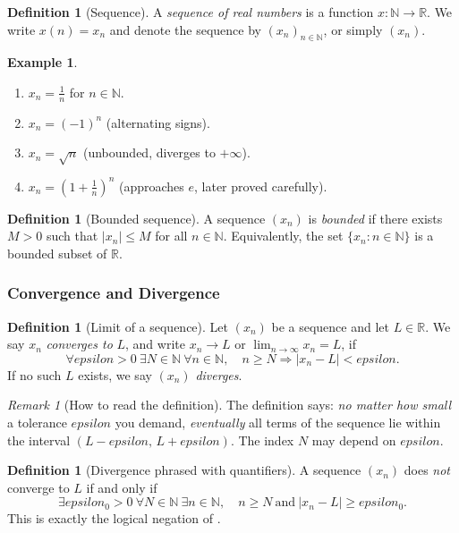 \documentclass[12pt]{article}
\numberwithin{equation}{section}
\def\abs#1{|#1|}
\def\eps{epsilon}
\newcommand{\RR}{\mathbb{R}}
\newcommand{\NN}{\mathbb{N}}
\DeclarePairedDelimiter{\abs}{\lvert}{\rvert}
\newcommand{\eps}{\varepsilon}               %
\theoremstyle{plain}
\theoremstyle{definition}
\newtheorem{definition}[theorem]{Definition}
\newtheorem{example}[theorem]{Example}
\theoremstyle{remark}
\newtheorem{remark}[theorem]{Remark}
\begin{document}
\begin{definition}[Sequence]
A \emph{sequence of real numbers} is a function $x:\NN\to\RR$.
We write $x(n)=x_n$ and denote the sequence by $(x_n)_{n\in\NN}$, or simply $(x_n)$.
\end{definition}

\begin{example}
\begin{enumerate}[label=(\alph*)]
\item $x_n = \frac{1}{n}$ for $n\in\NN$.
\item $x_n = (-1)^n$ (alternating signs).
\item $x_n = \sqrt{n}$ (unbounded, diverges to $+\infty$).
\item $x_n = \left(1+\frac{1}{n}\right)^n$ (approaches $e$, later proved carefully).
\end{enumerate}
\end{example}

\begin{definition}[Bounded sequence]
A sequence $(x_n)$ is \emph{bounded} if there exists $M>0$ such that $\abs{x_n}\le M$ for all $n\in\NN$.
Equivalently, the set $\{x_n:n\in\NN\}$ is a bounded subset of $\RR$.
\end{definition}

\subsubsection{Convergence and Divergence}

\begin{definition}[Limit of a sequence]\label{def:seq-limit}
Let $(x_n)$ be a sequence and let $L\in\RR$.
We say $x_n$ \emph{converges to} $L$, and write $x_n\to L$ or $\lim_{n\to\infty}x_n=L$, if
\[
\forall \eps>0\ \exists N\in\NN\ \forall n\in\NN,\quad n\ge N \Rightarrow \abs{x_n-L}<\eps.
\]
If no such $L$ exists, we say $(x_n)$ \emph{diverges}.
\end{definition}

\begin{remark}[How to read the definition]
The definition says: \emph{no matter how small} a tolerance $\eps$ you demand, \emph{eventually} all terms of the sequence lie within the interval $(L-\eps,\,L+\eps)$.
The index $N$ may depend on $\eps$.
\end{remark}

\begin{definition}[Divergence phrased with quantifiers]
A sequence $(x_n)$ does \emph{not} converge to $L$ if and only if
\[
\exists \eps_0>0\ \forall N\in\NN\ \exists n\in\NN,\quad n\ge N \ \text{and}\  \abs{x_n-L}\ge \eps_0.
\]
This is exactly the logical negation of .
\end{definition}
\end{document}
